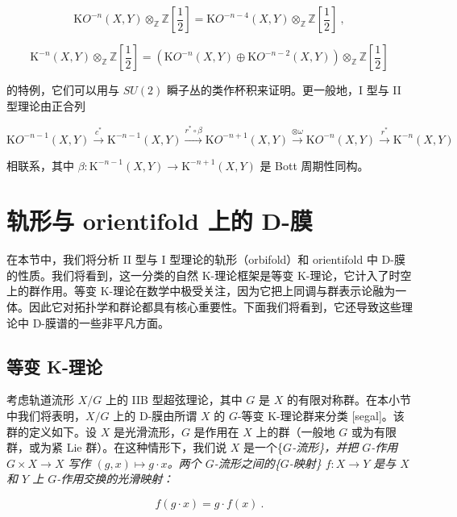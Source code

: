 \documentclass[11pt,a4paper]{ctexart}
\newcommand{\SrcRange}[2]{\marginpar{\raggedright\footnotesize 原文 p.#1}}
\begin{document}
\[{\mathrm KO}^{-n}(X,Y)\otimes_{{\mathbb{Z}}}{\mathbb{Z}}\left[\mbox{$\frac{1}{2}$}\right]=
{\mathrm KO}^{-n-4}(X,Y)\otimes_{\mathbb{Z}}{\mathbb{Z}}\left[\mbox{$\frac{1}{2}$}\right]\ ,\]

\[{\mathrm K}^{-n}(X,Y)\otimes_{{\mathbb{Z}}}{\mathbb{Z}}\left[\mbox{$\frac{1}{2}$}\right]=
\left({\mathrm KO}^{-n}(X,Y)\oplus{\mathrm KO}^{-n-2}(X,Y)\right)\otimes_{{\mathbb{Z}}}
{\mathbb{Z}}\left[\mbox{$\frac{1}{2}$}\right]\]

的特例，它们可以用与 \(SU(2)\) 瞬子丛的类作杯积来证明。更一般地，I 型与 II 型理论由正合列

\[{\mathrm KO}^{-n-1}(X,Y)\stackrel{c^*}{\longrightarrow}{\mathrm K}^{-n-1}(X,Y)
\stackrel{r^*\circ\beta}{\longrightarrow}{\mathrm KO}^{-n+1}(X,Y)
\stackrel{\otimes\omega}{\longrightarrow}{\mathrm KO}^{-n}(X,Y)
\stackrel{r^*}{\longrightarrow}{\mathrm K}^{-n}(X,Y)\]

相联系，其中 \(\beta:{\mathrm K}^{-n-1}(X,Y)\to{\mathrm K}^{-n+1}(X,Y)\) 是 Bott 周期性同构。

\SrcRange{65}{65}
\section{轨形与 orientifold 上的 D-膜}\label{ux8f68ux5f62ux4e0e-orientifold-ux4e0aux7684-d-ux819c}

在本节中，我们将分析 II 型与 I 型理论的轨形（orbifold）和 orientifold 中 D-膜的性质。我们将看到，这一分类的自然 K-理论框架是等变 K-理论，它计入了时空上的群作用。等变 K-理论在数学中极受关注，因为它把上同调与群表示论融为一体。因此它对拓扑学和群论都具有核心重要性。下面我们将看到，它还导致这些理论中 D-膜谱的一些非平凡方面。

\SrcRange{65}{65}
\subsection{等变 K-理论}\label{ux7b49ux53d8-k-ux7406ux8bba}

考虑轨道流形 \(X/G\) 上的 IIB 型超弦理论，其中 \(G\) 是 \(X\) 的有限对称群。在本小节中我们将表明，\(X/G\) 上的 D-膜由所谓 \(X\) 的 \(G\)-等变 K-理论群来分类 [segal]。该群的定义如下。设 \(X\) 是光滑流形，\(G\) 是作用在 \(X\) 上的群（一般地 \(G\) 或为有限群，或为紧 Lie 群）。在这种情形下，我们说 \(X\) 是一个\{\it $G$-流形\}，并把 \(G\)-作用 \(G\times X\rightarrow X\) 写作 \((g,x)\mapsto g\cdot x\)。两个 \(G\)-流形之间的\{\it $G$-映射\} \(f:X\rightarrow Y\) 是与 \(X\) 和 \(Y\) 上 \(G\)-作用交换的光滑映射：

\[f(g\cdot x)=g\cdot f(x)\ .\]
\end{document}
